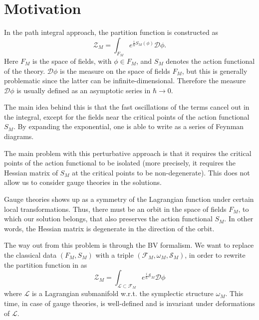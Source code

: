\section{Motivation}
\label{sec:motivation}

In the path integral approach, the partition function is constructed as 
\begin{equation}
\label{eq:parti_func}
    \mathcal{Z}_M = \int_{F_M} e^{\frac{i}{\hbar}S_M(\phi)} \mathcal{D}\phi .
\end{equation}
Here $F_M$ is the space of fields, with $\phi \in F_M$, and $S_M$ denotes the action functional of the theory.
$\mathcal{D} \phi$ is the measure on the space of fields $F_M$, but this is generally problematic since the latter can be infinite-dimensional.
Therefore the measure $\mathcal{D} \phi$ is usually defined as an asymptotic series in $\hbar \rightarrow 0$.

The main idea behind this is that the fast oscillations of the terms cancel out in the integral, except for the fields near the critical points of the action functional $S_M$.
By expanding the exponential, one is able to write  as a series of Feynman diagrams.

The main problem with this perturbative approach is that it requires the critical points of the action functional to be isolated (more precisely, it requires the Hessian matrix of $S_M$ at the critical points to be non-degenerate).
This does not allow us to consider gauge theories in the solutions.

Gauge theories shows up as a symmetry of the Lagrangian function under certain local transformations.
Thus, there must be an orbit in the space of fields $F_M$, to which our solution belongs, that also preserves the action functional $S_M$.
In other words, the Hessian matrix is degenerate in the direction of the orbit.

The way out from this problem is through the BV formalism.
We want to replace the classical data $(F_M, S_M)$ with a triple $(\mathcal{F}_M, \omega_M, \mathcal{S}_M)$, in order to rewrite the partition function in   as
\begin{equation}
\label{eq:part_func_M}
    \mathcal{Z}_M = \int_{\mathcal{L} \subset \mathcal{F}_M} e^{\frac{i}{\hbar} \mathcal{S}_M} \mathcal{D} \phi
\end{equation}
where $\mathcal{L}$ is a Lagrangian submanifold w.r.t. the symplectic structure $\omega_M$.
This time, in case of gauge theories,  is well-defined and is invariant under deformations of $\mathcal{L}$.